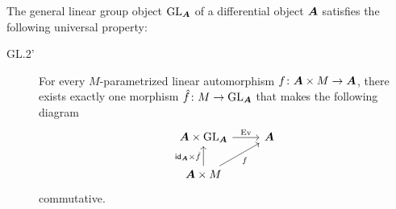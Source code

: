 \begin{lemma}
\label{lemma:gl-classifies-linear-automorphisms}
The general linear group object $\operatorname{GL}_{\bm{A}}$ of a differential object ${\bm{A}}$ satisfies the following universal property:
\begin{description}
\item[GL.2'] For every $M$-parametrized linear automorphism $f\colon{\bm{A}}\times M\to{\bm{A}}$, there exists exactly one morphism $\hat f\colon M\to\operatorname{GL}_{\bm{A}}$ that makes the following diagram
\begin{equation*}
\begin{tikzcd}
{\A\times\GL_\A} & \A \\
{\A\times M}
\arrow["\Ev", from=1-1, to=1-2]
\arrow["{\id_\A\times\hat f}", from=2-1, to=1-1]
\arrow["f"', from=2-1, to=1-2]
\end{tikzcd}
\end{equation*}
commutative.
\end{description}
\end{lemma}
